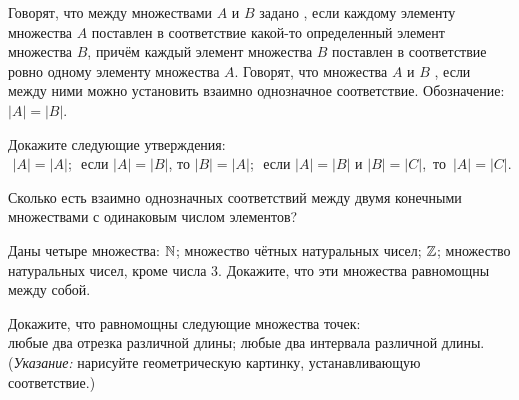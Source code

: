 \documentclass[a4paper,12pt]{article}
\begin{document}



Говорят, что между множествами $A$ и $B$ задано
, если каждому элементу множества $A$
поставлен в соответствие какой-то определенный элемент множества $B$,
причём каждый элемент множества $B$ поставлен в соответствие ровно
одному элементу множества $A$. Говорят, что множества $A$ и $B$ %
, если между ними можно установить взаимно
однозначное соответствие.
Обозначение: $|A| = |B|$.

 Докажите следующие утверждения:\\
 $\!\!\!$ $|A| = |A|$;
 $\!\!\!$ если $|A| = |B|$, то $|B| = |A|$;
 $\!\!\!$ если $|A| = |B|$ и $|B| = |C|$,~то~\hbox{$|A| = |C|$.}


Сколько есть взаимно однозначных соответствий между двумя конечными множествами с одинаковым числом элементов?


Даны четыре множества: $\mathbb{N}$; множество чётных натуральных
чисел; $\mathbb{Z}$; множество натуральных чисел, кроме числа 3.
Докажите, что эти множества равномощны между собой.

 Докажите, что равномощны следующие множества точек:\\
 любые два отрезка различной длины;
 любые два интервала различной длины.\\
{\small ({\em Указание:} нарисуйте геометрическую картинку, устанавливающую соответствие.)}
\end{document}
